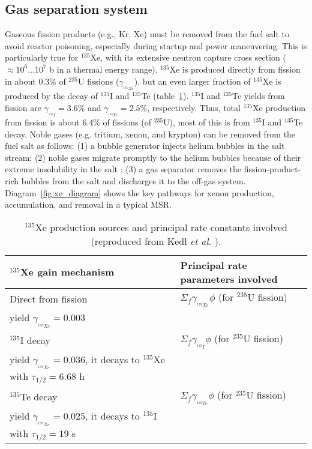 \subsection{Gas separation system} \label{sec:gas-separ}
Gaseous fission products (e.g., Kr, Xe) must be removed from the fuel salt 
to avoid reactor poisoning, especially during startup and power maneuvering. 
This is particularly true for $^{135}$Xe, with its extensive neutron capture 
cross section ($\approx10^6\dots10^7$ b in a thermal energy range). $^{135}$Xe 
is produced directly from fission in about 0.3\% of $^{235}$U fissions 
($\gamma_{_{^{135}Xe}}$), but an even larger fraction of $^{135}$Xe is 
produced by the decay of $^{135}$I and $^{135}$Te (table~\ref{tab:xe_gain}). 
$^{135}$I and $^{135}$Te yields from fission are 
$\gamma_{_{^{135}I}}\!=3.6$\% and $\gamma_{_{^{135}Te}}\!=2.5$\%, 
respectively. Thus, total $^{135}$Xe production  
from fission is about 6.4\% of fissions (of $^{235}$U), most of this is from 
$^{135}$I and $^{135}$Te decay. Noble gases (e.g. tritium, xenon, and krypton) can 
be removed from the fuel salt as follows: (1) a bubble generator injects 
helium bubbles in the salt stream; (2) noble gases migrate promptly to the 
helium bubbles because of their extreme insolubility in the salt  
\cite{robertson_conceptual_1971}; (3) a gas separator removes the 
fission-product-rich bubbles from the salt and discharges it to the off-gas 
system. Diagram~\ref{fig:xe_diagram} shows the key pathways for xenon 
production, accumulation, and removal in a typical \gls{MSR}.
\begin{table}[ht!]
	\caption{$^{135}$Xe production sources and principal rate constants 
		involved
		(reproduced from Kedl \emph{et al.} \cite{kedl_development_1967}).}
	\centering
	\begin{tabularx}{\textwidth}{b  b}
		\hline \textbf{$^{135}$Xe gain mechanism} & \textbf{Principal rate 
			parameters involved}  	\\ [5pt] \hline 
		Direct from fission & $\Sigma_f \gamma_{_{^{135}Xe}}\phi$ (for 
		$^{235}$U fission) \\
		yield $\gamma_{_{^{135}Xe}}\!\!\!=0.003$ & \\ [5pt] \hline 
		$^{135}$I decay     & $\Sigma_f \gamma_{_{^{135}I}}\phi$ (for 
		$^{235}$U fission) \\
		yield $\gamma_{_{^{135}Xe}}\!\!\!=0.036$, it decays to $^{135}$Xe with 
		$\tau_{1/2}=6.68$ h & 			                    \\	[5pt]	\hline 
		$^{135}$Te decay    & $\Sigma_f \gamma_{_{^{135}Te}}\phi$ (for 
		$^{235}$U 		fission) \\
		yield $\gamma_{_{^{135}Xe}}\!\!\!=0.025$, 
		it decays to $^{135}$I with $\tau_{1/2}=19$ s 
		& 			                    \\ [5pt]	\hline
	\end{tabularx}
	\label{tab:xe_gain}
\end{table}

